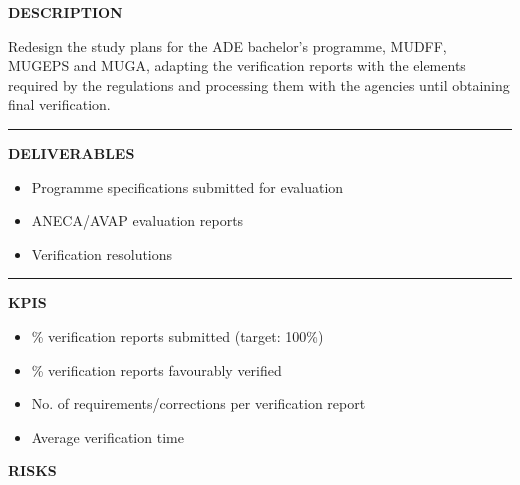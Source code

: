 \documentclass[11pt,a4paper]{scrreprt}
\newcommand{\fieldlabel}[1]{%
  {\footnotesize\sffamily\bfseries\color{mutedcolor}\MakeUppercase{#1}}\par\nopagebreak[4]
}
\newcommand{\fieldsep}{\vspace{3pt}\noindent\textcolor{bordercolor}{\rule{\linewidth}{0.4pt}}\vspace{3pt}\par}
\begin{document}
\begin{tcolorbox}[pabox={aacolor}{A.P.1.2 \enspace\textbullet\enspace Redesign of Study Plans and Verification Reports}]

\fieldlabel{Description}
{\small Redesign the study plans for the ADE bachelor's programme, MUDFF, MUGEPS and MUGA, adapting the verification reports with the elements required by the regulations and processing them with the agencies until obtaining final verification.}\par
\fieldsep
\fieldlabel{Deliverables}
{\small \begin{itemize}[noitemsep,topsep=2pt]
\item Programme specifications submitted for evaluation
\item ANECA/AVAP evaluation reports
\item Verification resolutions
\end{itemize}}\par
\fieldsep
\fieldlabel{KPIs}
{\small \begin{itemize}[noitemsep,topsep=2pt]
\item \% verification reports submitted (target: 100\%)
\item \% verification reports favourably verified
\item No. of requirements/corrections per verification report
\item Average verification time
\end{itemize}}\par
\end{tcolorbox}
\begin{tcolorbox}[riskbox]
{\footnotesize\sffamily\bfseries\color{red!50!black} RISKS}\par{}
\end{tcolorbox}
\end{document}
